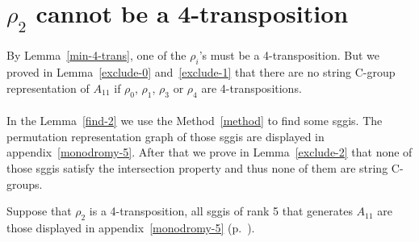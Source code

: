\section{$\rho_2$ cannot be a 4-transposition}

\paragraph{}
By Lemma~\ref{min-4-trans}, one of the $\rho_i$'s must be a 4-transposition. But we proved in Lemma~\ref{exclude-0} and~\ref{exclude-1} that there are no string C-group representation of $A_{11}$ if $\rho_0$, $\rho_1$, $\rho_3$ or $\rho_4$ are 4-transpositions.

\paragraph{}
In the Lemma~\ref{find-2} we use the Method~\ref{method} to find some sggis. The permutation representation graph of those sggis are displayed in appendix~\ref{monodromy-5}. After that we prove in Lemma~\ref{exclude-2} that none of those sggis satisfy the intersection property and thus none of them are string C-groups.

\begin{lemma}
  \label{find-2}
  Suppose that $\rho_2$ is a 4-transposition, all sggis of rank 5 that generates $A_{11}$ are those displayed in appendix~\ref{monodromy-5} (p.~\pageref{monodromy-5}).
\end{lemma}

